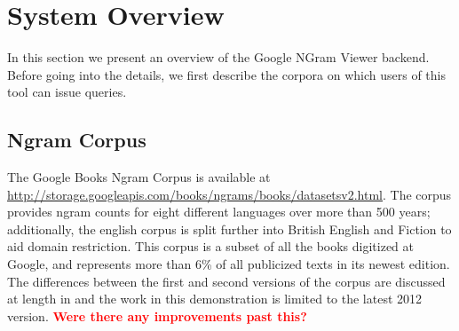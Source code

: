\documentclass[11pt]{article}
\begin{document}
\section{System Overview}

In this section we present an overview of the Google NGram Viewer backend. Before going into the details, we first describe the corpora on which users of this tool can issue queries.

\subsection{Ngram Corpus}
The Google Books Ngram Corpus is available at \url{http://storage.googleapis.com/books/ngrams/books/datasetsv2.html}. The corpus provides ngram counts for eight different languages over more than 500 years; additionally, the english corpus is split further into British English and Fiction to aid domain restriction. This corpus is a subset of all the books digitized at Google, and represents more than 6\% of all publicized texts in its newest edition. The differences between the first and second versions of the corpus are discussed at length in  and the work in this demonstration is limited to the latest 2012 version.
\textcolor{red}{\bf Were there any improvements past this?}
\end{document}
